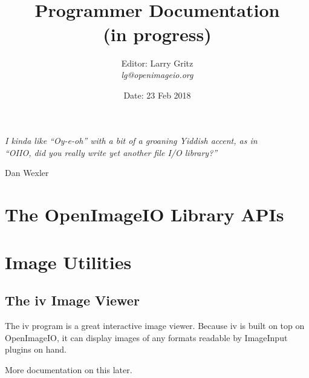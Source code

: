 \documentclass[11pt,letterpaper]{book}
\title{ 
{\Huge{\bf \product}
{\bf\sffamily \versionnumber} \medskip \\ \huge Programmer Documentation
 \\ \large (in progress)
} \bigskip }
\author{Editor: Larry Gritz \\
\emph{lg@openimageio.org}
 \bigskip \\
}
\date{{\large
Date: 23 Feb 2018
}}
\def\product{{\sffamily OpenImageIO}\xspace}
\def\ImageInput{{\codefont ImageInput}\xspace}
\begin{document}
\frontmatter

\maketitle



\vspace*{2in}

\begin{centering}
\emph{I kinda like ``Oy-e-oh'' with a bit of a groaning Yiddish accent, as in\\
``OIIO, did you really write yet another file I/O library?''} \\
\end{centering}
\medskip
\begin{centering}
\center Dan Wexler \\
\end{centering}




\setcounter{tocdepth}{1}
\tableofcontents

\mainmatter



\part{The OpenImageIO Library APIs}













\part{Image Utilities}



\chapter{The {\kw iv} Image Viewer}
\label{chap:iv}

The {\cf iv} program is a great interactive image viewer.  Because {\cf
  iv} is built on top on \product, it can display images of any formats
readable by \ImageInput plugins on hand.

\medskip

More documentation on this later.
\end{document}
